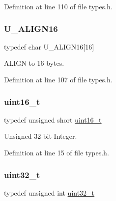 Definition at line 110 of file types.\+h.

\mbox{\label{a00134_a9093ff6c6894ca213db42a2d686d0ad6_a9093ff6c6894ca213db42a2d686d0ad6}} 
\subsubsection{\texorpdfstring{U\+\_\+\+A\+L\+I\+G\+N16}{U\_ALIGN16}}
{\footnotesize\ttfamily typedef char U\+\_\+\+A\+L\+I\+G\+N16\mbox{[}16\mbox{]}}



A\+L\+I\+GN to 16 bytes. 



Definition at line 107 of file types.\+h.

\mbox{\label{a00134_a273cf69d639a59973b6019625df33e30_a273cf69d639a59973b6019625df33e30}} 
\subsubsection{\texorpdfstring{uint16\+\_\+t}{uint16\_t}}
{\footnotesize\ttfamily typedef unsigned short \hyperlink{a00134_a273cf69d639a59973b6019625df33e30_a273cf69d639a59973b6019625df33e30}{uint16\+\_\+t}}



Unsigned 32-\/bit Integer. 



Definition at line 15 of file types.\+h.

\mbox{\label{a00134_a435d1572bf3f880d55459d9805097f62_a435d1572bf3f880d55459d9805097f62}} 
\subsubsection{\texorpdfstring{uint32\+\_\+t}{uint32\_t}}
{\footnotesize\ttfamily typedef unsigned int \hyperlink{a00134_a435d1572bf3f880d55459d9805097f62_a435d1572bf3f880d55459d9805097f62}{uint32\+\_\+t}}



